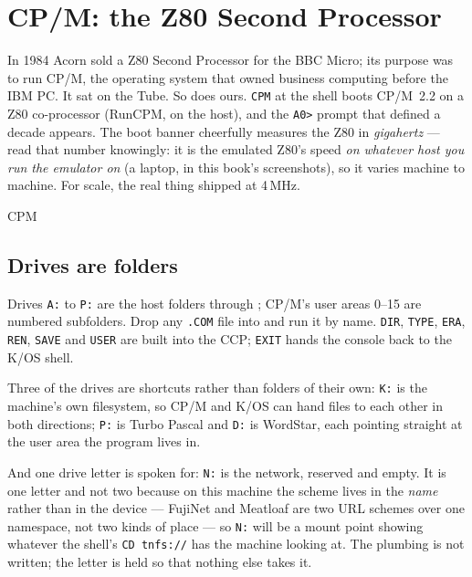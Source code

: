 \chapter{CP/M: the Z80 Second Processor}\label{cha:cpm}

In 1984 Acorn sold a Z80 Second Processor for the BBC Micro; its purpose
was to run CP/M, the operating system that owned business computing before
the IBM PC. It sat on the Tube. So does ours. \verb|CPM| at the shell boots
CP/M~2.2 on a Z80 co-processor (RunCPM, on the host), and the \verb|A0>|
prompt that defined a decade appears. The boot banner cheerfully measures
the Z80 in \emph{gigahertz} --- read that number knowingly: it is the
emulated Z80's speed \emph{on whatever host you run the emulator on} (a
laptop, in this book's screenshots), so it varies machine to machine.
For scale, the real thing shipped at 4\,MHz.

\begin{type}
CPM
\end{type}


\section{Drives are folders}
Drives \verb|A:| to \verb|P:| are the host folders 
through ; CP/M's user areas 0--15 are numbered subfolders.
Drop any \texttt{.COM} file into  and run it by name.
\verb|DIR|, \verb|TYPE|, \verb|ERA|, \verb|REN|, \verb|SAVE| and
\verb|USER| are built into the CCP; \verb|EXIT| hands the console back to
the K/OS shell.

Three of the drives are shortcuts rather than folders of their own:
\verb|K:| is the machine's own filesystem, so CP/M and K/OS can hand files
to each other in both directions; \verb|P:| is Turbo Pascal and \verb|D:|
is WordStar, each pointing straight at the user area the program lives in.

And one drive letter is spoken for: \verb|N:| is the network, reserved
and empty. It is one letter and not two because on this machine the
scheme lives in the \emph{name} rather than in the device --- FujiNet
and Meatloaf are two URL schemes over one namespace, not two kinds of
place --- so \verb|N:| will be a mount point showing whatever the
shell's \verb|CD tnfs://| has the machine looking at. The plumbing is
not written; the letter is held so that nothing else takes it.

